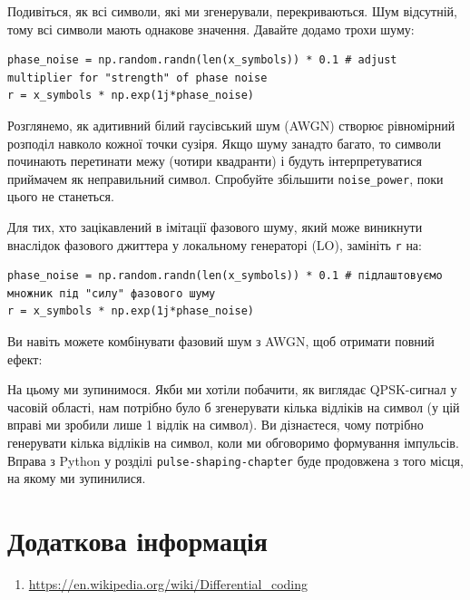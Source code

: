 \href{../_images/qpsk_python.svg}{}

Подивіться, як всі символи, які ми згенерували, перекриваються. Шум
відсутній, тому всі символи мають однакове значення. Давайте додамо
трохи шуму:

\begin{Verbatim}[breaklines=true,breakanywhere=true,fontsize=\small]
phase_noise = np.random.randn(len(x_symbols)) * 0.1 # adjust multiplier for "strength" of phase noise
r = x_symbols * np.exp(1j*phase_noise)
\end{Verbatim}

\href{../_images/phase_jitter.svg\%0A:alt:\%20QPSK\%20з\%20AWGN\%20шумом,\%20згенерованим\%20або\%20змодельованим\%20у\%20Python}{}

Розглянемо, як адитивний білий гаусівський шум (AWGN) створює
рівномірний розподіл навколо кожної точки сузір\textquotesingle я. Якщо
шуму занадто багато, то символи починають перетинати межу (чотири
квадранти) і будуть інтерпретуватися приймачем як неправильний символ.
Спробуйте збільшити \texttt{noise\_power}, поки цього не станеться.

Для тих, хто зацікавлений в імітації фазового шуму, який може виникнути
внаслідок фазового джиттера у локальному генераторі (LO), замініть
\texttt{r} на:

\begin{Verbatim}[breaklines=true,breakanywhere=true,fontsize=\small]
phase_noise = np.random.randn(len(x_symbols)) * 0.1 # підлаштовуємо множник під "силу" фазового шуму
r = x_symbols * np.exp(1j*phase_noise)
\end{Verbatim}

\href{../_images/phase_jitter.svg}{}

Ви навіть можете комбінувати фазовий шум з AWGN, щоб отримати повний
ефект:

\href{../_images/phase_jitter_awgn.svg}{}

На цьому ми зупинимося. Якби ми хотіли побачити, як виглядає QPSK-сигнал
у часовій області, нам потрібно було б згенерувати кілька відліків на
символ (у цій вправі ми зробили лише 1 відлік на символ). Ви дізнаєтеся,
чому потрібно генерувати кілька відліків на символ, коли ми обговоримо
формування імпульсів. Вправа з Python у розділі
\texttt{pulse-shaping-chapter} буде продовжена з того місця, на якому ми
зупинилися.

\section{Додаткова
інформація}\label{ux434ux43eux434ux430ux442ux43aux43eux432ux430-ux456ux43dux444ux43eux440ux43cux430ux446ux456ux44f}

\begin{enumerate}
\tightlist
\item
  \url{https://en.wikipedia.org/wiki/Differential_coding}
\end{enumerate}
